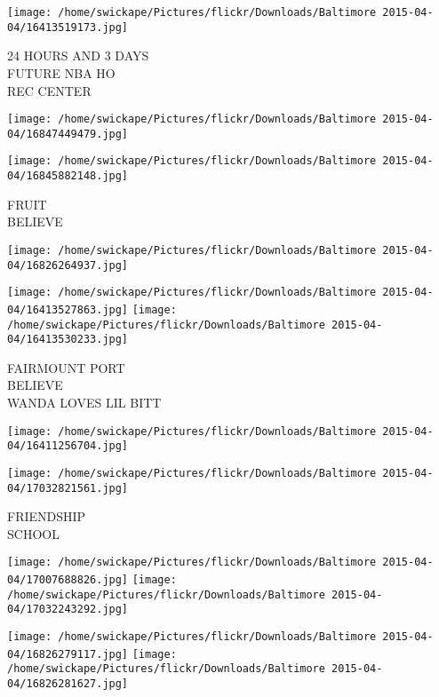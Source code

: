 \documentclass[10pt,letterpaper]{article}
\begin{document}
\vspace{0.25in}
\texttt{[image: /home/swickape/Pictures/flickr/Downloads/Baltimore 2015-04-04/16413519173.jpg]}

24 HOURS AND 3 DAYS\\
FUTURE NBA HO\\
REC CENTER\\
\pagebreak

\texttt{[image: /home/swickape/Pictures/flickr/Downloads/Baltimore 2015-04-04/16847449479.jpg]}

\vspace{0.25in}
\texttt{[image: /home/swickape/Pictures/flickr/Downloads/Baltimore 2015-04-04/16845882148.jpg]}

FRUIT\\
BELIEVE\\
\pagebreak

\texttt{[image: /home/swickape/Pictures/flickr/Downloads/Baltimore 2015-04-04/16826264937.jpg]}

\vspace{0.25in}
\texttt{[image: /home/swickape/Pictures/flickr/Downloads/Baltimore 2015-04-04/16413527863.jpg]}
\texttt{[image: /home/swickape/Pictures/flickr/Downloads/Baltimore 2015-04-04/16413530233.jpg]}

FAIRMOUNT PORT\\
BELIEVE\\
WANDA LOVES LIL BITT\\
\pagebreak

\texttt{[image: /home/swickape/Pictures/flickr/Downloads/Baltimore 2015-04-04/16411256704.jpg]}

\vspace{0.25in}
\texttt{[image: /home/swickape/Pictures/flickr/Downloads/Baltimore 2015-04-04/17032821561.jpg]}

FRIENDSHIP\\
SCHOOL\\
\pagebreak

\texttt{[image: /home/swickape/Pictures/flickr/Downloads/Baltimore 2015-04-04/17007688826.jpg]}
\texttt{[image: /home/swickape/Pictures/flickr/Downloads/Baltimore 2015-04-04/17032243292.jpg]}

\texttt{[image: /home/swickape/Pictures/flickr/Downloads/Baltimore 2015-04-04/16826279117.jpg]}
\texttt{[image: /home/swickape/Pictures/flickr/Downloads/Baltimore 2015-04-04/16826281627.jpg]}
\end{document}
